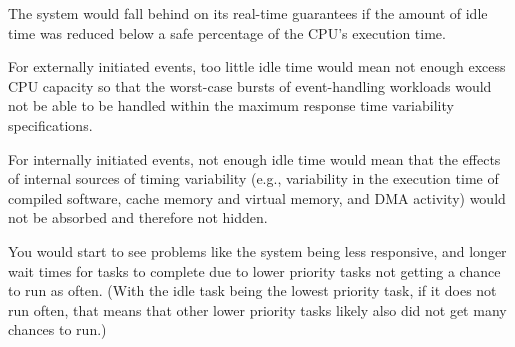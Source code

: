 The system would fall behind on its real-time guarantees if the amount of idle
time was reduced below a safe percentage of the CPU's execution time. 

For externally initiated events, too little idle time would mean not enough
excess CPU capacity so that the worst-case bursts of event-handling workloads
would not be able to be handled within the maximum response time variability
specifications. 

For internally initiated events, not enough idle time would mean that the
effects of internal sources of timing variability (e.g., variability in the
execution time of compiled software, cache memory and virtual memory, and DMA
activity) would not be absorbed and therefore not hidden. 

You would start to see problems like the system being less responsive, and
longer wait times for tasks to complete due to lower priority tasks not getting
a chance to run as often. (With the idle task being the lowest priority task, if
it does not run often, that means that other lower priority tasks likely also
did not get many chances to run.)
